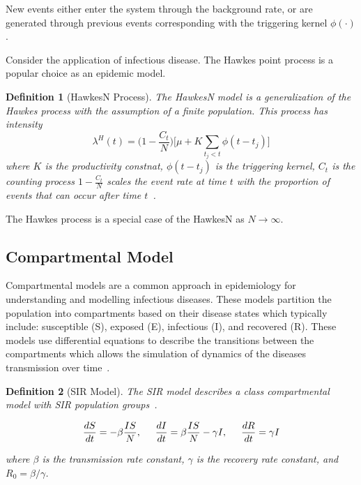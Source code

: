 \documentclass[12pt]{article}
\newtheorem{definition}{Definition}
\begin{document}
New events either enter the system through the background rate, or are generated through previous events corresponding with the triggering kernel $\phi(\cdot)$. 


Consider the application of infectious disease. The Hawkes point process is a popular choice as an epidemic model. 
\vspace{3mm}

\begin{definition}[HawkesN Process] 
The HawkesN model is a generalization of the Hawkes process with the assumption of a finite population. This process has intensity
\[
\lambda^H(t) = \Big ( 1 - \frac{C_t}{N} \Big ) \Big [ \mu + K \sum_{t_j < t} \phi (t - t_j) \Big ]
\]  
where $K$ is the productivity constnat, $\phi( t - t_j)$ is the triggering kernel, $C_t$ is the counting process $ 1 - \frac{C_t}{N}$ scales the event rate at time $t$ with the proportion of events that can occur after time $t$~\cite{Rizoiu2018}. 

  
\end{definition}




The Hawkes process is a special case of the HawkesN as $N \to \infty$. 


\subsection{Compartmental Model}

Compartmental models are a common approach in epidemiology for understanding and modelling infectious diseases. These models partition the population into compartments based on their disease states which typically include: susceptible (S), exposed (E), infectious (I), and recovered (R). These models use differential equations to describe the transitions between the compartments which allows the simulation of dynamics of the diseases transmission over time~\cite{Bertozzi2020}. 
\\

\begin{definition}[SIR Model]
The SIR model describes a class compartmental model with SIR population groups~\cite{Bertozzi2020}. 
 
\[
\frac{dS}{dt} = - \beta \frac{IS}{N}, \hspace{5mm}
\frac{dI}{dt} = \beta \frac{IS}{N} - \gamma I, \hspace{5mm}
\frac{dR}{dt} = \gamma I 
\]

where $\beta$ is the transmission rate constant, $\gamma$ is the recovery rate constant, and $R_0 = \beta/\gamma$. 
\end{definition}
\vspace{3mm}
\end{document}

